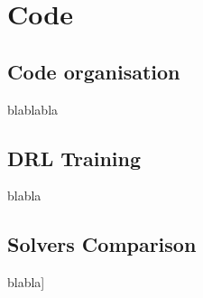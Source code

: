 
\chapter{Code} %

\label{Chapter3} %


\section{Code organisation}

blablabla

\section{DRL Training}

blabla


\section{Solvers Comparison}

blabla]
